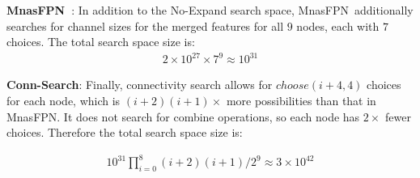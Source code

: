 \documentclass[10pt,twocolumn,letterpaper]{article}
\def\Mnasfpn{MnasFPN~}
\def\Mnasfpnnospace{MnasFPN}
\begin{document}
{\bf \Mnasfpn}: In addition to the No-Expand search space, \Mnasfpn additionally searches for channel sizes for the merged features for all $9$ nodes, each with $7$ choices. The total search space size is:
\begin{align*}
    2\times 10^{27} \times 7^9 \approx 10^{31}
\end{align*}

{\bf Conn-Search}: Finally, connectivity search allows for $choose(i+4, 4)$ choices for each node, which is $(i+2)(i+1) \times$ more possibilities than that in \Mnasfpnnospace. It does not search for combine operations, so each node has $2\times$ fewer choices. Therefore the total search space size is:

\begin{align*}
    10^{31} \prod_{i=0}^8 (i+2)(i+1) / 2^{9} \approx 3 \times 10^{42}
\end{align*}
 
\cleardoublepage
\end{document}
